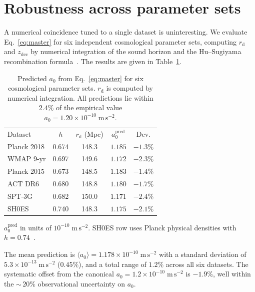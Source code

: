 \documentclass[prl,twocolumn,superscriptaddress,longbibliography]{revtex4-2}
\newcommand{\zdec}{z_{\mathrm{dec}}}
\newcommand{\rd}{r_{\mathrm{d}}}
\newcommand{\azero}{a_0}
\newcommand{\ms}{\mathrm{m\,s}^{-2}}
\begin{document}
\section{Robustness across parameter sets}
\label{sec:robustness}

A numerical coincidence tuned to a single dataset is
uninteresting.
We evaluate Eq.~\eqref{eq:master} for six independent
cosmological parameter sets, computing $\rd$ and $\zdec$
by numerical integration of the sound horizon and
the Hu--Sugiyama recombination
formula~\cite{EH1998,HS1996}.
The results are given in Table~\ref{tab:robust}.

\begin{table}[t]
\centering
\caption{Predicted $\azero$ from
Eq.~\eqref{eq:master} for six cosmological
parameter sets.
$\rd$ is computed by numerical integration.
All predictions lie within $2.4\%$ of the
empirical value $\azero = 1.20 \times 10^{-10}\;\ms$.}
\label{tab:robust}
\begin{ruledtabular}
\begin{tabular}{lcccc}
Dataset & $h$ & $\rd$ (Mpc)
  & $\azero^{\mathrm{pred}}$
  & Dev. \\
\colrule
Planck 2018 & 0.674 & 148.3 & $1.185$ & $-1.3\%$ \\
WMAP 9-yr   & 0.697 & 149.6 & $1.172$ & $-2.3\%$ \\
Planck 2015 & 0.673 & 148.5 & $1.183$ & $-1.4\%$ \\
ACT DR6     & 0.680 & 148.8 & $1.180$ & $-1.7\%$ \\
SPT-3G      & 0.682 & 150.0 & $1.171$ & $-2.4\%$ \\
SH0ES       & 0.740 & 148.3 & $1.175$ & $-2.1\%$ \\
\end{tabular}
\end{ruledtabular}
\vspace{1mm}
{\footnotesize
$\azero^{\mathrm{pred}}$ in units of
$10^{-10}\;\ms$.
SH0ES row uses Planck physical densities
with $h = 0.74$~\cite{Riess2022}.}
\end{table}

The mean prediction is
$\langle\azero\rangle = 1.178 \times 10^{-10}\;\ms$
with a standard deviation of
$5.3 \times 10^{-13}\;\ms$ ($0.45\%$), and a
total range of $1.2\%$ across all six datasets.
The systematic offset from the canonical
$\azero = 1.2 \times 10^{-10}\;\ms$ is $-1.9\%$,
well within the ${\sim}\,20\%$ observational
uncertainty on $\azero$.
\end{document}
